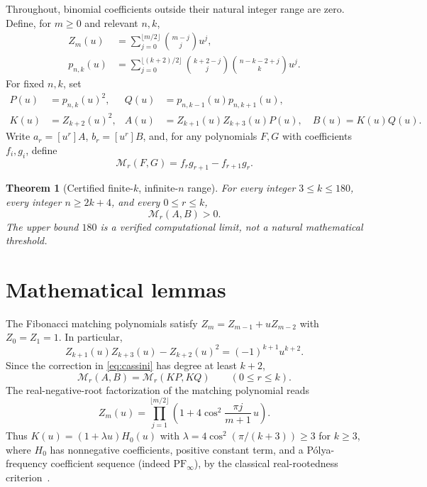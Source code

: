 \documentclass[11pt,a4paper]{article}
\newtheorem{theorem}{Theorem}
\newcommand{\coef}[2]{[u^{#1}]#2}
\newcommand{\M}{\mathcal M}
\begin{document}
Throughout, binomial coefficients outside their natural integer range
are zero. Define, for $m\ge0$ and relevant $n,k$,
\begin{align}
 Z_m(u)&=\sum_{j=0}^{\lfloor m/2\rfloor}\binom{m-j}{j}u^j,\label{eq:Z}\\
 p_{n,k}(u)&=\sum_{j=0}^{\lfloor(k+2)/2\rfloor}
 \binom{k+2-j}{j}\binom{n-k-2+j}{k}u^j.\label{eq:p}
\end{align}
For fixed $n,k$, set
\begin{align}
 P(u)&=p_{n,k}(u)^2, & Q(u)&=p_{n,k-1}(u)p_{n,k+1}(u),\\
 K(u)&=Z_{k+2}(u)^2, &
 A(u)&=Z_{k+1}(u)Z_{k+3}(u)P(u),\quad B(u)=K(u)Q(u).
\end{align}
Write $a_r=\coef{r}{A}$, $b_r=\coef{r}{B}$, and, for any
polynomials $F,G$ with coefficients $f_i,g_i$, define
\begin{equation}\label{eq:minor}
 \M_r(F,G)=f_rg_{r+1}-f_{r+1}g_r.
\end{equation}

\begin{theorem}[Certified finite-$k$, infinite-$n$ range]\label{thm:main}
For every integer $3\le k\le180$, every integer $n\ge2k+4$,
and every $0\le r\le k$,
\begin{equation}\boxed{\M_r(A,B)>0.}\end{equation}
The upper bound $180$ is a verified computational limit, not a natural
mathematical threshold.
\end{theorem}

\section{Mathematical lemmas}
The Fibonacci matching polynomials satisfy
$Z_m=Z_{m-1}+uZ_{m-2}$ with $Z_0=Z_1=1$. In particular,
\begin{equation}\label{eq:cassini}
Z_{k+1}(u)Z_{k+3}(u)-Z_{k+2}(u)^2=(-1)^{k+1}u^{k+2}.
\end{equation}
Since the correction in \eqref{eq:cassini} has degree at least $k+2$,
\begin{equation}\label{eq:low}
 \M_r(A,B)=\M_r(KP,KQ) \qquad (0\le r\le k).
\end{equation}
The real-negative-root factorization of the matching polynomial reads
\begin{equation}\label{eq:factor}
 Z_m(u)=\prod_{j=1}^{\lfloor m/2\rfloor}
 \left(1+4\cos^2\!\frac{\pi j}{m+1}\,u\right).
\end{equation}
Thus $K(u)=(1+\lambda u)H_0(u)$ with
$\lambda=4\cos^2(\pi/(k+3))\ge3$ for $k\ge3$, where $H_0$
has nonnegative coefficients, positive constant term, and a
P\'olya-frequency coefficient sequence (indeed $\mathrm{PF}_\infty$),
by the classical real-rootedness criterion~\cite{ASW}.
\end{document}
